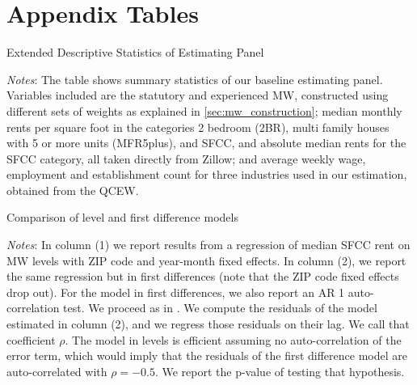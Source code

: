\section{Appendix Tables}

\begin{table}[h!]
	\caption{Extended Descriptive Statistics of Estimating Panel}
	\label{tab:estimating_panel_stats_long}
	\centering
	
	\begin{minipage}{0.95\textwidth} \footnotesize
		\vspace{3mm} 
		\textit{Notes}: The table shows summary statistics of our baseline estimating panel.
		Variables included are the statutory and experienced MW, constructed using different
		sets of weights as explained in \autoref{sec:mw_construction}; median monthly rents 
		per square foot in the categories 2 bedroom (2BR), multi family houses with 5 or more 
		units (MFR5plus), and SFCC, and absolute median rents for the SFCC category, all taken
		directly from Zillow; and average weekly wage, employment and establishment count 
		for three industries used in our estimation, obtained from the QCEW.
	\end{minipage}
\end{table}

\clearpage
\begin{table}[h!] \centering
	\caption{Comparison of level and first difference models}
	\label{tab:level_auto}
	
	\begin{minipage}{0.95\textwidth} \footnotesize
		\vspace{3mm} 
		\textit{Notes}: In column (1) we report results from a regression of median SFCC rent on 
		MW levels with ZIP code and year-month fixed effects. In column (2), we report the same 
		regression but in first differences (note that the ZIP code  fixed effects drop out). For 
		the model in first differences, we also report an AR 1 auto-correlation test. We proceed 
		as in \parencite[][section 10.6.3]{wooldridge2010}. We compute the residuals of the model 
		estimated in column (2), and we regress those residuals on their lag. We call that 
		coefficient $\rho$. The model in levels is efficient assuming no auto-correlation of the 
		error term, which would imply that the residuals of the first difference model are 
		auto-correlated with $\rho = -0.5$. We report the p-value of testing that hypothesis.
	\end{minipage} 
\end{table}

